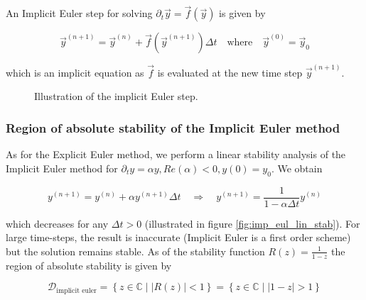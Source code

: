 An Implicit Euler step for solving $\partial_t \vec{y} = \vec{f} \left(\vec{y} \right)$ is given by

\[
    \vec{y}^{(n+1)} = \vec{y}^{(n)} + \vec{f} \left( \vec{y}^{(n + 1)} \right) \Delta t \quad\mathrm{where}\quad   \vec{y}^{(0)} = \vec{y}_0
\]

which is an implicit equation as $\vec{f}$ is evaluated at the new time step $\vec{y}^{(n+1)}$.


\begin{figure}[!htb]
  \centering
  \hfill
  \caption{Illustration of the implicit Euler step.}
  \label{fig:implicit_euler_intuition}
\end{figure}



\subsubsection*{Region of absolute stability of the Implicit Euler method}

As for the Explicit Euler method, we perform a linear stability analysis of the Implicit Euler method for $\partial_t y = \alpha y, Re(\alpha) < 0, y(0) = y_0$. We obtain

\[
  y^{(n+1)} = y^{(n)} + \alpha y^{(n+1)} \Delta t \quad \Rightarrow \quad y^{(n+1)} = \frac{1}{1 - \alpha \Delta t} y^{(n)}
\]

which decreases for any $\Delta t > 0$ (illustrated in figure \ref{fig:imp_eul_lin_stab}). For large time-steps, the result is inaccurate (Implicit Euler is a first order scheme) but the solution remains stable. As of the stability function $R(z) = \frac{1}{1 - z}$ the region of absolute stability is given by

\[ 
  \mathcal{D}_{\text{implicit euler}} = \left\{ z \in \mathbb{C} \mid \left| R(z) \right| < 1 \right\} = \left\{ z \in \mathbb{C} \mid \left| 1 - z \right| > 1 \right\}
\]

